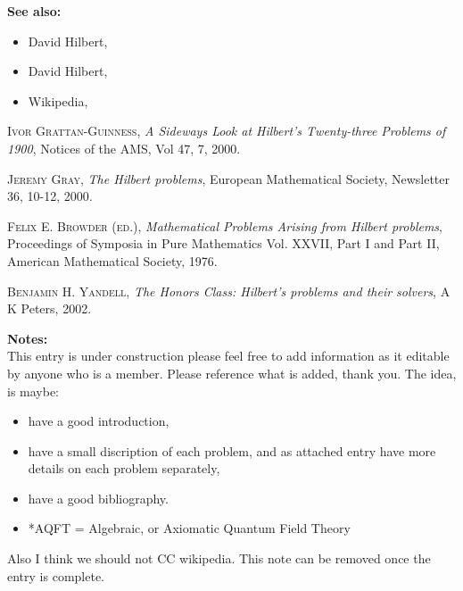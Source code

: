 \documentclass[12pt]{article}
\begin{document}
\textbf{See also:}
\begin{itemize}
\item David Hilbert, 
\item David Hilbert, 
\item Wikipedia, 
\end{itemize}

\begin{thebibliography}{10}
{\scshape Ivor Grattan-Guinness}, \emph{A Sideways Look at Hilbert's
Twenty-three Problems of 1900}, Notices of the AMS, Vol 47, 7, 2000.

{\scshape Jeremy Gray}, \emph{The Hilbert problems}, European Mathematical Society, Newsletter 36, 10-12, 2000.

{\scshape Felix E. Browder (ed.)}, \emph{Mathematical Problems Arising from Hilbert problems}, Proceedings of Symposia in Pure Mathematics Vol. XXVII, Part I and Part II, American Mathematical Society, 1976.

{\scshape Benjamin H. Yandell}, \emph{The Honors Class: Hilbert's problems and their solvers}, A K Peters, 2002.
\end{thebibliography}


\textbf{Notes:}\\
This entry is under construction please feel free to add information as it editable by anyone who is a member.  Please reference what is added, thank you.
The idea, is maybe:
\begin{itemize} 
\item have a good introduction,
\item have a small discription of each problem, and as attached entry have more details on each problem separately,
\item have a good bibliography.
\item *AQFT = Algebraic, or Axiomatic Quantum Field Theory
\end{itemize}
Also I think we should not CC wikipedia.  This note can be removed once
the entry is complete.



\end{document}
